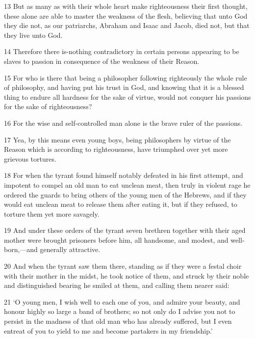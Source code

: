 \par 13 But as many as with their whole heart make righteousness their first thought, these alone are able to master the weakness of the flesh, believing that unto God they die not, as our patriarchs, Abraham and Isaac and Jacob, died not, but that they live unto God.

\par 14 Therefore there is-nothing contradictory in certain persons appearing to be slaves to passion in consequence of the weakness of their Reason.

\par 15 For who is there that being a philosopher following righteously the whole rule of philosophy, and having put his trust in God, and knowing that it is a blessed thing to endure all hardness for the sake of virtue, would not conquer his passions for the sake of righteousness?

\par 16 For the wise and self-controlled man alone is the brave ruler of the passions.

\par 17 Yea, by this means even young boys, being philosophers by virtue of the Reason which is according to righteousness, have triumphed over yet more grievous tortures.

\par 18 For when the tyrant found himself notably defeated in his first attempt, and impotent to compel an old man to eat unclean meat, then truly in violent rage he ordered the guards to bring others of the young men of the Hebrews, and if they would eat unclean meat to release them after eating it, but if they refused, to torture them yet more savagely.

\par 19 And under these orders of the tyrant seven brethren together with their aged mother were brought prisoners before him, all handsome, and modest, and well-born,—and generally attractive.

\par 20 And when the tyrant saw them there, standing as if they were a festal choir with their mother in the midst, he took notice of them, and struck by their noble and distinguished bearing he smiled at them, and calling them nearer said:

\par 21 ‘O young men, I wish well to each one of you, and admire your beauty, and honour highly so large a band of brothers; so not only do I advise you not to persist in the madness of that old man who has already suffered, but I even entreat of you to yield to me and become partakers in my friendship.’

